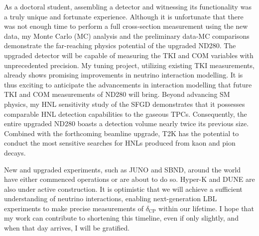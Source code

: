 As a doctoral student, assembling a detector and witnessing its functionality was a truly unique and fortunate experience.
Although it is unfortunate that there was not enough time to perform a full cross-section measurement using the new data, my Monte Carlo (MC) analysis and the preliminary data-MC comparisons demonstrate the far-reaching physics potential of the upgraded ND280.
The upgraded detector will be capable of measuring the TKI and COM variables with unprecedented precision.
My tuning project, utilizing existing TKI measurements, already shows promising improvements in neutrino interaction modelling.
It is thus exciting to anticipate the advancements in interaction modelling that future TKI and COM measurements of ND280 will bring.
Beyond advancing SM physics, my HNL sensitivity study of the SFGD demonstrates that it possesses comparable HNL detection capabilities to the gaseous TPCs.
Consequently, the entire upgraded ND280 boasts a detection volume nearly twice its previous size.
Combined with the forthcoming beamline upgrade, T2K has the potential to conduct the most sensitive searches for HNLs produced from kaon and pion decays.

New and upgraded experiments, such as JUNO and SBND, around the world have either commenced operations or are about to do so.
Hyper-K and DUNE are also under active construction.
It is optimistic that we will achieve a sufficient understanding of neutrino interactions, enabling next-generation LBL experiments to make precise measurements of $\delta_{\text{CP}}$ within our lifetime.
I hope that my work can contribute to shortening this timeline, even if only slightly, and when that day arrives, I will be gratified.